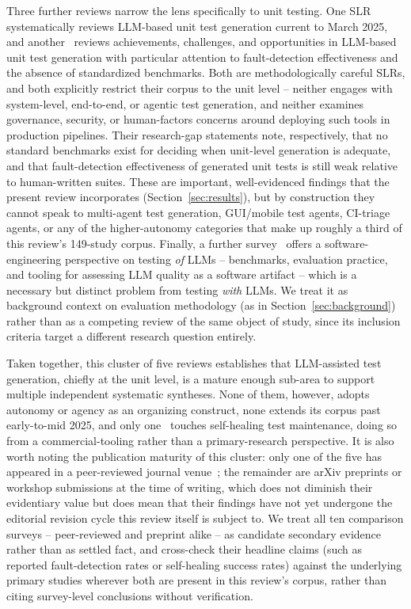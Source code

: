 Three further reviews narrow the lens specifically to unit testing.
One SLR~\cite{slr0082025} systematically reviews LLM-based
unit test generation current to March 2025, and another~\cite{slr0072025}
reviews achievements, challenges, and opportunities in LLM-based unit
test generation with particular attention to fault-detection
effectiveness and the absence of standardized benchmarks. Both are
methodologically careful SLRs, and both explicitly restrict their
corpus to the unit level -- neither engages with system-level,
end-to-end, or agentic test generation, and neither examines
governance, security, or human-factors concerns around deploying such
tools in production pipelines. Their research-gap statements note,
respectively, that no standard benchmarks exist for deciding when
unit-level generation is adequate, and that fault-detection
effectiveness of generated unit tests is still weak relative to
human-written suites. These are important, well-evidenced findings
that the present review incorporates (Section~\ref{sec:results}), but
by construction they cannot speak to multi-agent test generation,
GUI/mobile test agents, CI-triage agents, or any of the
higher-autonomy categories that make up roughly a third of this
review's 149-study corpus. Finally, a further survey~\cite{slr0102024} offers a
software-engineering perspective on testing \emph{of} LLMs --
benchmarks, evaluation practice, and tooling for assessing LLM
quality as a software artifact -- which is a necessary but distinct
problem from testing \emph{with} LLMs. We treat it as background
context on evaluation methodology (as in
Section~\ref{sec:background}) rather than as a competing review of
the same object of study, since its inclusion criteria target a
different research question entirely.

Taken together, this cluster of five reviews establishes that
LLM-assisted test generation, chiefly at the unit level, is a mature
enough sub-area to support multiple independent systematic syntheses.
None of them, however, adopts autonomy or agency as an organizing
construct, none extends its corpus past early-to-mid 2025, and only
one~\cite{slr0092024} touches self-healing test maintenance, doing
so from a commercial-tooling rather than a primary-research
perspective. It is also worth noting the publication maturity of this
cluster: only one of the five has appeared in a peer-reviewed journal
venue~\cite{slr0012024}; the remainder are arXiv preprints or
workshop submissions at the time of writing, which does not diminish
their evidentiary value but does mean that their findings have not
yet undergone the editorial revision cycle this review itself is
subject to. We treat all ten comparison surveys -- peer-reviewed and
preprint alike -- as candidate secondary evidence rather than as
settled fact, and cross-check their headline claims (such as reported
fault-detection rates or self-healing success rates) against the
underlying primary studies wherever both are present in this review's
corpus, rather than citing survey-level conclusions without
verification.

